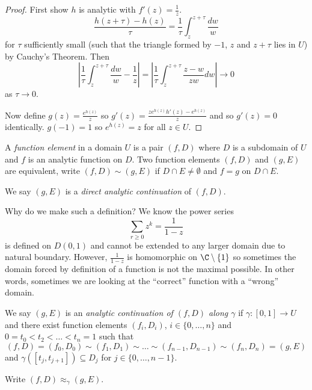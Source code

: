 \documentclass[a4paper]{article}
\begin{document}
\begin{proof}
  First show \(h\) is analytic with \(f'(z) = \frac{1}{z}\).
  \[
    \frac{h(z + \tau) - h(z)}{\tau}
    = \frac{1}{\tau} \int_z^{z + \tau} \frac{dw}{w}
  \]
  for \(\tau\) sufficiently small (such that the triangle formed by \(-1\), \(z\) and \(z + \tau\) lies in \(U\)) by Cauchy's Theorem. Then
  \[
    \left| \frac{1}{\tau} \int_z^{z + \tau} \frac{dw}{w} - \frac{1}{z} \right|
    = \left| \frac{1}{\tau} \int_z^{z + \tau} \frac{z - w}{zw} dw \right|
    \to 0
  \]
  as \(\tau \to 0\).

  Now define \(g(z) = \frac{e^{h(z)}}{z}\) so \(g'(z) = \frac{z e^{h(z)} h'(z) - e^{h(z)}}{z}\) and so \(g'(z) = 0\) identically. \(g(-1) = 1\) so \(e^{h(z)} = z\) for all \(z \in U\).

\end{proof}

\begin{definition}
  A \emph{function element} in a domain \(U\) is a pair \((f, D)\) where \(D\) is a subdomain of \(U\) and \(f\) is an analytic function on \(D\). Two function elements \((f, D)\) and \((g, E)\) are equivalent, write \((f, D) \sim (g, E)\) if \(D \cap E \neq \emptyset\) and \(f = g\) on \(D \cap E\).

  We say \((g, E)\) is a \emph{direct analytic continuation} of \((f, D)\).
\end{definition}

Why do we make such a definition? We know the power series
\[
  \sum_{r \geq 0} z^k = \frac{1}{1 - z}
\]
is defined on \(D(0, 1)\) and cannot be extended to any larger domain due to natural boundary. However, \(\frac{1}{1 - z}\) is homomorphic  on \(\C \setminus \{1\}\) so sometimes the domain forced by definition of a function is not the maximal possible. In other words, sometimes we are looking at the ``correct'' function with a ``wrong'' domain.

\begin{definition}
  We say \((g, E)\) is an \emph{analytic continuation of \((f, D)\) along \(\gamma\)} if \(\gamma: [0, 1] \to U\) and there exist function elements \((f_i, D_i)\), \(i \in \{0, \dots, n\}\) and \(0 = t_0 < t_2 < \dots < t_n = 1\) such that
  \[
    (f, D) = (f_0, D_0) \sim (f_1, D_1) \sim \dots \sim (f_{n - 1}, D_{n - 1}) \sim (f_n, D_n) = (g, E)
  \]
  and \(\gamma([t_j, t_{j + 1}]) \subseteq D_j\) for \(j \in \{0, \dots, n - 1\}\).

  Write \((f, D) \approx_\gamma (g, E)\).
\end{definition}
\end{document}
